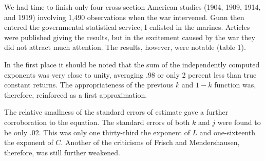 \documentclass{article}
\begin{document}
We had time to finish only four cross-section American studies (1904, 1909, 1914, and 1919) involving 1,490 observations when the war intervened. Gunn then entered the governmental statistical service; I enlisted in the marines. Articles were published giving the results, but in the excitement caused by the war they did not attract much attention. The results, however, were notable (table 1).

In the first place it should be noted that the sum of the independently computed exponents was very close to unity, averaging .98 or only 2 percent less than true constant returns. The appropriateness of the previous \(k\) and \(1-k\) function was, therefore, reinforced as a first approximation.

The relative smallness of the standard errors of estimate gave a further corroboration to the equation. The standard errors of both \(k\) and \(j\) were found to be only .02. This was only one thirty-third the exponent of \(L\) and one-sixteenth the exponent of \(C\). Another of the criticisms of Frisch and Mendershausen, therefore, was still further weakened.
\end{document}
